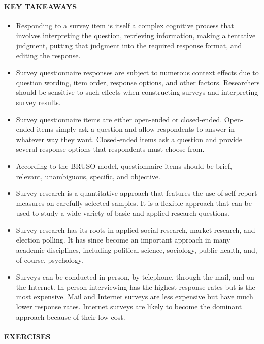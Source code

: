 \documentclass[
]{krantz}
\providecommand{\tightlist}{%
  \setlength{\itemsep}{0pt}\setlength{\parskip}{0pt}}
\begin{document}
\hypertarget{key-takeaways-24}{%
\paragraph*{KEY TAKEAWAYS}\label{key-takeaways-24}}

\begin{itemize}
\tightlist
\item
  Responding to a survey item is itself a complex cognitive process that involves interpreting the question, retrieving information, making a tentative judgment, putting that judgment into the required response format, and editing the response.
\item
  Survey questionnaire responses are subject to numerous context effects due to question wording, item order, response options, and other factors. Researchers should be sensitive to such effects when constructing surveys and interpreting survey results.
\item
  Survey questionnaire items are either open-ended or closed-ended. Open-ended items simply ask a question and allow respondents to answer in whatever way they want. Closed-ended items ask a question and provide several response options that respondents must choose from.
\item
  According to the BRUSO model, questionnaire items should be brief, relevant, unambiguous, specific, and objective.
\item
  Survey research is a quantitative approach that features the use of self-report measures on carefully selected samples. It is a flexible approach that can be used to study a wide variety of basic and applied research questions.
\item
  Survey research has its roots in applied social research, market research, and election polling. It has since become an important approach in many academic disciplines, including political science, sociology, public health, and, of course, psychology.
\item
  Surveys can be conducted in person, by telephone, through the mail, and on the Internet. In-person interviewing has the highest response rates but is the most expensive. Mail and Internet surveys are less expensive but have much lower response rates. Internet surveys are likely to become the dominant approach because of their low cost.
\end{itemize}

\hypertarget{exercises-20}{%
\paragraph*{EXERCISES}\label{exercises-20}}
\end{document}
